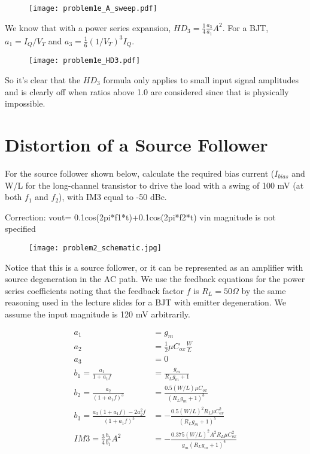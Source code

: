 \begin{enumerate}[label=(\alph*)]
    \begin{figure}[H]
        \centering \texttt{[image: problem1e\_A\_sweep.pdf]}
    \end{figure}

    We know that with a power series expansion, $HD_3 = \frac{1}{4} \frac{a_3}{a_1} A^2$.
    For a BJT, $a_1 = I_Q/V_T$ and $a_3 = \frac{1}{6} (1/V_T)^3 I_Q$.

    \begin{figure}[H]
        \centering \texttt{[image: problem1e\_HD3.pdf]}
    \end{figure}

    So it's clear that the $HD_3$ formula only applies to small input signal amplitudes and is clearly off when ratios above 1.0 are considered since that is physically impossible.

\end{enumerate}

\section{Distortion of a Source Follower}
{\color{blue} For the source follower shown below, calculate the required bias current ($I_{bias}$ and W/L for the long-channel transistor to drive the load with a swing of 100 mV (at both $f_1$ and $f_2$), with IM3 equal to -50 dBc.}

{\color{red} Correction: vout= 0.1cos(2pi*f1*t)+0.1cos(2pi*f2*t) vin magnitude is not specified}

\begin{figure}[H]
    \centering \texttt{[image: problem2\_schematic.jpg]}
\end{figure}

Notice that this is a source follower, or it can be represented as an amplifier with source degeneration in the AC path.
We use the feedback equations for the power series coefficients noting that the feedback factor $f$ is $R_L = 50 \Omega$ by the same reasoning used in the lecture slides for a BJT with emitter degeneration.
We assume the input magnitude is 120 mV arbitrarily.

\begin{align*}
    a_1 &= g_m \\
    a_2 &= \frac{1}{2} \mu C_{ox} \frac{W}{L} \\
    a_3 &= 0 \\
    b_1 = \frac{a_1}{1 + a_1 f} &= \frac{g_{m}}{R_{L} g_{m} + 1} \\
    b_2 = \frac{a_2}{(1 + a_1 f)^3} &= \frac{0.5 (W/L) \mu C_{ox}}{\left(R_{L} g_{m} + 1\right)^{3}} \\
    b_3 = \frac{a_3 (1 + a_1 f) - 2 a_2^2 f}{(1 + a_1 f)^5} &= - \frac{0.5 (W/L)^{2} R_{L} \mu C_{ox}^{2}}{\left(R_{L} g_{m} + 1\right)^{5}} \\
    IM3 = \frac{3}{4} \frac{b_3}{b_1} A^2 &= - \frac{0.375 (W/L)^{2} A^{2} R_{L} \mu C_{ox}^{2}}{g_{m} \left(R_{L} g_{m} + 1\right)^{4}}
\end{align*}

